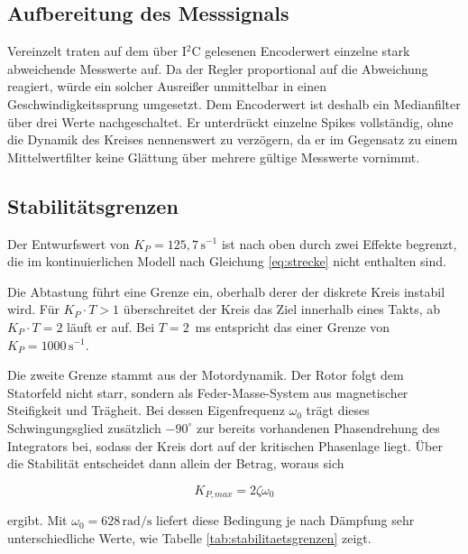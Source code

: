 \subsection*{Aufbereitung des Messsignals}

Vereinzelt traten auf dem über I$^2$C gelesenen Encoderwert einzelne stark abweichende
Messwerte auf. Da der Regler proportional auf die Abweichung reagiert, würde ein solcher
Ausreißer unmittelbar in einen Geschwindigkeitssprung umgesetzt. Dem Encoderwert ist
deshalb ein Medianfilter über drei Werte nachgeschaltet. Er unterdrückt einzelne Spikes
vollständig, ohne die Dynamik des Kreises nennenswert zu verzögern, da er im Gegensatz zu
einem Mittelwertfilter keine Glättung über mehrere gültige Messwerte vornimmt.

\subsection*{Stabilitätsgrenzen}

Der Entwurfswert von $K_P = 125{,}7\,\mathrm{s^{-1}}$ ist nach oben durch zwei Effekte
begrenzt, die im kontinuierlichen Modell nach Gleichung \ref{eq:strecke} nicht enthalten
sind.

Die Abtastung führt eine Grenze ein, oberhalb derer der diskrete Kreis instabil wird. Für
$K_P \cdot T > 1$ überschreitet der Kreis das Ziel innerhalb eines Takts, ab
$K_P \cdot T = 2$ läuft er auf. Bei $T = 2$~ms entspricht das einer Grenze von
$K_P = 1000\,\mathrm{s^{-1}}$.

Die zweite Grenze stammt aus der Motordynamik. Der Rotor folgt dem Statorfeld nicht starr,
sondern als Feder-Masse-System aus magnetischer Steifigkeit und Trägheit. Bei dessen
Eigenfrequenz $\omega_0$ trägt dieses Schwingungsglied zusätzlich $-90^\circ$ zur bereits
vorhandenen Phasendrehung des Integrators bei, sodass der Kreis dort auf der kritischen
Phasenlage liegt. Über die Stabilität entscheidet dann allein der Betrag, woraus sich

\begin{equation}
    K_{P,max} = 2 \zeta \omega_0
    \label{eq:resonanzgrenze}
\end{equation}

ergibt. Mit $\omega_0 = 628\,\mathrm{rad/s}$ liefert diese Bedingung je nach Dämpfung
sehr unterschiedliche Werte, wie Tabelle \ref{tab:stabilitaetsgrenzen} zeigt.

